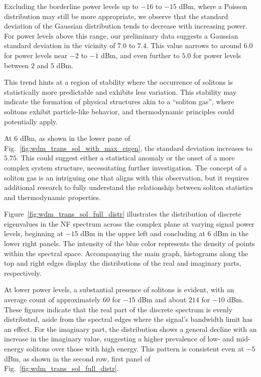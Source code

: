Excluding the borderline power levels up to \(-16\) to \(-15\) dBm, where a Poisson distribution may still be more appropriate, we observe that the standard deviation of the Gaussian distribution tends to decrease with increasing power. For power levels above this range, our preliminary data suggests a Gaussian standard deviation in the vicinity of \(7.0\) to \(7.4\). This value narrows to around \(6.0\) for power levels near \(-2\) to \(-1\) dBm, and even further to \(5.0\) for power levels between \(2\) and \(5\) dBm.

This trend hints at a region of stability where the occurrence of solitons is statistically more predictable and exhibits less variation. This stability may indicate the formation of physical structures akin to a ``soliton gas'', where solitons exhibit particle-like behavior, and thermodynamic principles could potentially apply.

At \(6\) dBm, as shown in the lower pane of Fig.~\ref{fig:wdm_trans_sol_with_max_eigen}, the standard deviation increases to \(5.75\). This could suggest either a statistical anomaly or the onset of a more complex system structure, necessitating further investigation. The concept of a soliton gas is an intriguing one that aligns with this observation, but it requires additional research to fully understand the relationship between soliton statistics and thermodynamic properties.






Figure~\ref{fig:wdm_trans_sol_full_distr} illustrates the distribution of discrete eigenvalues in the NF spectrum across the complex plane at varying signal power levels, beginning at \(-15\) dBm in the upper left and concluding at \(6\) dBm in the lower right panels. The intensity of the blue color represents the density of points within the spectral space. Accompanying the main graph, histograms along the top and right edges display the distributions of the real and imaginary parts, respectively.

At lower power levels, a substantial presence of solitons is evident, with an average count of approximately \(60\) for \(-15\) dBm and about \(214\) for \(-10\) dBm. These figures indicate that the real part of the discrete spectrum is evenly distributed, aside from the spectral edges where the signal's bandwidth limit has an effect. For the imaginary part, the distribution shows a general decline with an increase in the imaginary value, suggesting a higher prevalence of low- and mid-energy solitons over those with high energy. This pattern is consistent even at \(-5\) dBm, as shown in the second row, first panel of Fig.~\ref{fig:wdm_trans_sol_full_distr}.

